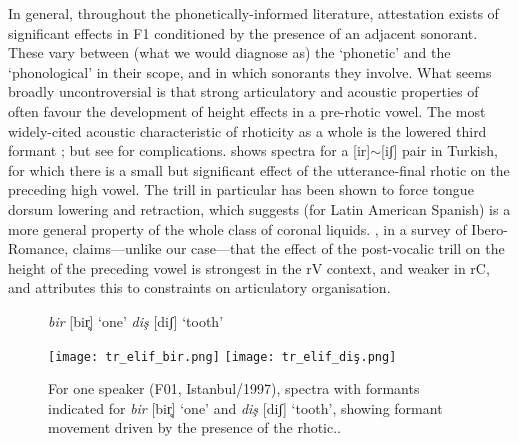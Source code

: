 In general, throughout the phonetically-informed literature, attestation exists of significant effects in F1 conditioned by the presence of an adjacent sonorant. These vary between (what we would diagnose as) the `phonetic' and the `phonological' in their scope, and in which sonorants they involve. What seems broadly uncontroversial is that strong articulatory and acoustic properties of  often favour the development of height effects in a pre-rhotic vowel. The most widely-cited acoustic characteristic of rhoticity as a whole is the lowered third formant \citep{Ladefoged2003}; but see \citet{Lindau1985} for complications.  shows spectra for a [ir]$\sim$[iʃ] pair in Turkish, for which there is a small but significant effect of the utterance-final rhotic on the preceding high vowel. The trill in particular \citep{Recasens1991,Recasens1999,Sole2002} has been shown to force tongue dorsum lowering and retraction, which \citet{Proctor2009} suggests (for Latin American Spanish) is a more general property of the whole class of coronal liquids. \citet{Bradley2010}, in a survey of Ibero-Romance, claims---unlike our case---that the effect of the post-vocalic trill on the height of the preceding vowel is strongest in the \textunderscore rV context, and weaker in \textunderscore rC, and attributes this to constraints on articulatory organisation.

\begin{figure}[ht]
  \centering

  { \textit{bir} [bir̥] `one' \hfill \textit{diş} [diʃ] `tooth' }

  \texttt{[image: tr\_elif\_bir.png]}\hfill
  \texttt{[image: tr\_elif\_diş.png]}
  \caption[Spectrum for \textit{bir} `one' and \textit{diş} `tooth'.]{For one speaker (F01, Istanbul/1997), spectra with formants indicated for \emph{bir} [bir̥] `one' and \textit{diş} [diʃ] `tooth', showing formant movement driven by the presence of the rhotic.\footnotemark.}
  \label{fig:tr_rhotic_spectrum}
\end{figure}


